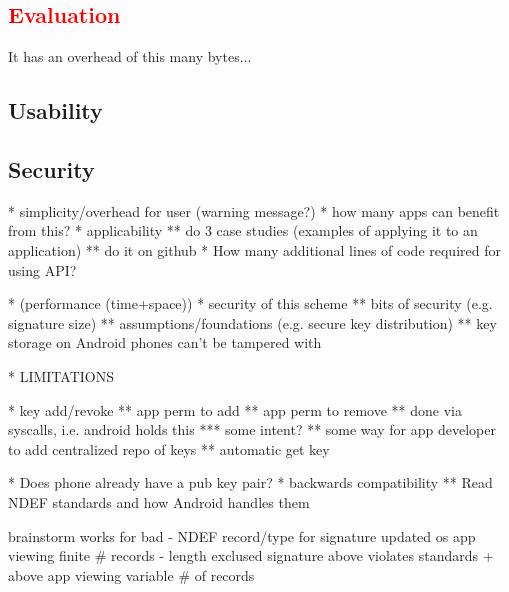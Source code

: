 \documentclass[12pt]{article}
\newcommand\TODO[1]{\textcolor{red}{#1}}
\begin{document}
\TODO{\section{Evaluation}}
It has an overhead of this many bytes... 
\subsection{Usability}
\subsection{Security}
* simplicity/overhead for user (warning message?)
* how many apps can benefit from this?
* applicability
** do 3 case studies (examples of applying it to an application)
** do it on github
* How many additional lines of code required for using API?

* (performance (time+space))
* security of this scheme
** bits of security (e.g. signature size)
** assumptions/foundations (e.g. secure key distribution)
** key storage on Android phones can't be tampered with

* LIMITATIONS

* key add/revoke
** app perm to add
** app perm to remove
** done via syscalls, i.e. android holds this
*** some intent?
** some way for app developer to add centralized repo of keys
** automatic get key

* Does phone already have a pub key pair?
* backwards compatibility
** Read NDEF standards and how Android handles them

brainstorm                         works for                           bad
- NDEF record/type for signature   updated os
                                   app viewing finite \# records
- length exclused signature        above                               violates standards
  + above                          app viewing variable \# of records   
\end{document}
